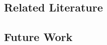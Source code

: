 \documentclass{article} %
\begin{document}
\subsection{Related Literature}


\subsection{Future Work}



\end{document}
